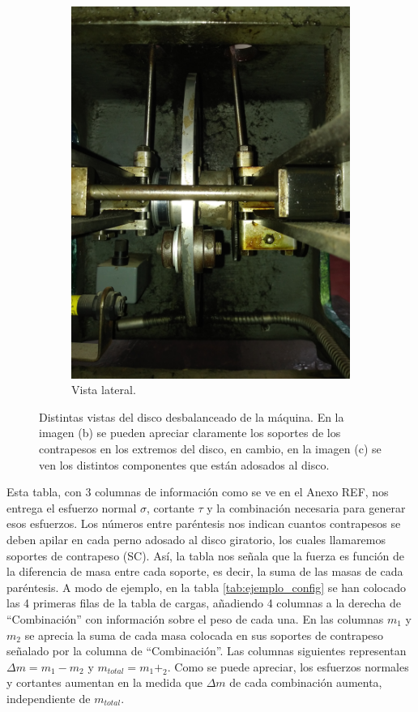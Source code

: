 \begin{figure}[h]
\begin{subfigure}{0.32\linewidth}
		\includegraphics[angle=270, origin=c, width=\linewidth]{Imagenes/disco_lateral.jpg}
		\caption{Vista lateral.}\label{fig:disco_lat}
	\end{subfigure}%
\caption{Distintas vistas del disco desbalanceado de la máquina. En la imagen (b) se pueden apreciar claramente los soportes de los contrapesos en los extremos del disco, en cambio, en la imagen (c) se ven los distintos componentes que están adosados al disco.}
\label{fig:disco_completo}
\end{figure}

Esta tabla, con 3 columnas de información como se ve en el Anexo REF, nos entrega el esfuerzo normal $\sigma$, cortante $\tau$ y la combinación necesaria para generar esos esfuerzos. Los números entre paréntesis nos indican cuantos contrapesos se deben apilar en cada perno adosado al disco giratorio, los cuales llamaremos soportes de contrapeso (SC). Así, la tabla nos señala que la fuerza es función de la diferencia de masa entre cada soporte, es decir, la suma de las masas de cada paréntesis. A modo de ejemplo, en la tabla \ref{tab:ejemplo_config} se han colocado las 4 primeras filas de la tabla de cargas, añadiendo 4 columnas a la derecha de ``Combinación'' con información sobre el peso de cada una. En las columnas $m_1$ y $m_2$ se aprecia la suma de cada masa colocada en sus soportes de contrapeso señalado por la columna de ``Combinación''. Las columnas siguientes representan $\Delta m = m_1-m_2$ y $m_{total}=m_1+_2$. Como se puede apreciar, los esfuerzos normales y cortantes aumentan en la medida que $\Delta m$ de cada combinación aumenta, independiente de $m_{total}$.

